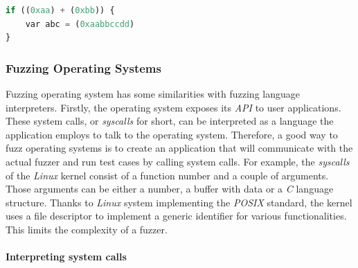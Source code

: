 \begin{minipage}{\linewidth}
\begin{lstlisting}[language=python,caption={Generated program from syntax tree},label={lst:gensrc}]
if ((0xaa) + (0xbb)) {
    var abc = (0xaabbccdd)
}    
\end{lstlisting}    
\end{minipage}


\subsubsection{Fuzzing Operating Systems}

Fuzzing operating system has some similarities with fuzzing language interpreters. Firstly, the operating system exposes its \textit{API} to user applications. These system calls, or \textit{syscalls} for short, can be interpreted as a language the application employs to talk to the operating system. Therefore, a good way to fuzz operating systems is to create an application that will communicate with the actual fuzzer and run test cases by calling system calls. For example, the \textit{syscalls} of the \textit{Linux} kernel consist of a function number and a couple of arguments. Those arguments can be either a number, a buffer with data or a \textit{C} language structure. Thanks to \textit{Linux} system implementing the \textit{POSIX} standard, the kernel uses a file descriptor to implement a generic identifier for various functionalities. This limits the complexity of a fuzzer. 

\paragraph{Interpreting system calls}
 
